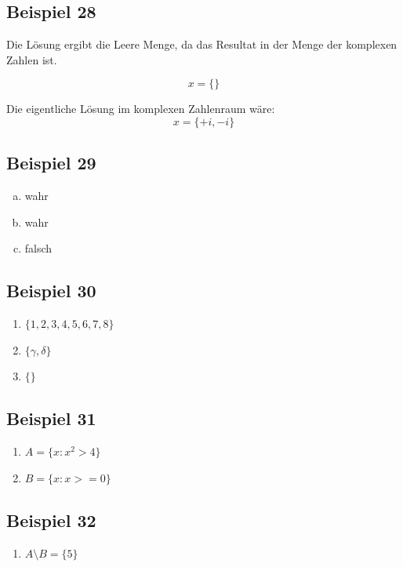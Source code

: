 \documentclass[12pt, a4paper, oneside]{article}
\begin{document}
\subsection{Beispiel 28}
Die Lösung ergibt die Leere Menge, da das Resultat in der Menge der komplexen Zahlen ist.

\begin{equation}
  x = \{\}
\end{equation}

Die eigentliche Lösung im komplexen Zahlenraum wäre:
\begin{equation}
  x = \{+i, -i\}
\end{equation}

\subsection{Beispiel 29}
\begin{enumerate}[a)]
  \item wahr
  \item wahr
  \item falsch
\end{enumerate}

\subsection{Beispiel 30}
\begin{enumerate}
  \item $\{1, 2, 3, 4, 5, 6, 7, 8\}$
  \item $\{\gamma, \delta\}$
  \item $\{\}$
\end{enumerate}

\subsection{Beispiel 31}
\begin{enumerate}[$\bullet$]
  \item $A = \{x : x^{2} > 4\}$
  \item $B = \{x: x >= 0\}$
\end{enumerate}

\subsection{Beispiel 32}
\begin{enumerate}[$\bullet$]
  \item $A \setminus B = \{5\}$
\end{enumerate}
\end{document}
